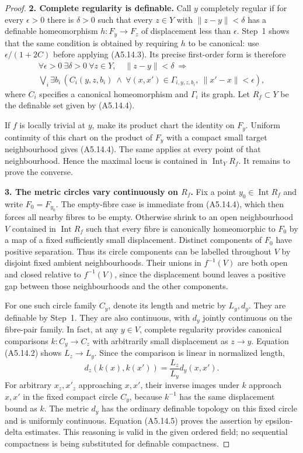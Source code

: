 \begin{proof}
\medskip\noindent\textbf{2. Complete regularity is definable.}
Call $y$ completely regular if for every $\epsilon>0$ there is
$\delta>0$ such that every $z\in Y$ with $\|z-y\|<\delta$
has a definable homeomorphism $h:F_y\to F_z$ of displacement
less than $\epsilon$.  Step~1 shows that the same condition is
obtained by requiring $h$ to be canonical: use
$\epsilon/(1+2C)$ before applying (A5.14.3).  Its precise
first-order form is therefore
\[
 \begin{gathered}
 \forall\epsilon>0\ \exists\delta>0\ \forall z\in Y,\quad
 \|z-y\|<\delta\ \Longrightarrow\\
 \bigvee_i\exists b_i\,
 \left(C_i(y,z,b_i)\ \wedge\
 \forall(x,x')\in\Gamma_{i,y,z,b_i},\ \|x'-x\|<\epsilon\right),
 \end{gathered}                                           \tag{A5.14.4}
\]
where $C_i$ specifies a canonical homeomorphism and
$\Gamma_i$ its graph.  Let $R_f\subset Y$ be the definable set
given by (A5.14.4).

If $f$ is locally trivial at $y$, make its product chart the
identity on $F_y$.  Uniform continuity of this chart on the
product of $F_y$ with a compact small target neighbourhood
gives (A5.14.4).  The same applies at every point of that
neighbourhood.  Hence the maximal locus is contained in
$\operatorname{Int}_Y R_f$.  It remains to prove the converse.

\medskip\noindent\textbf{3. The metric circles vary continuously on $R_f$.}
Fix a point $y_0\in\operatorname{Int}R_f$ and write $F_0=F_{y_0}$.
The empty-fibre case is immediate from (A5.14.4), which then
forces all nearby fibres to be empty.  Otherwise shrink to an
open neighbourhood $V$ contained in $\operatorname{Int}R_f$
such that every fibre is canonically homeomorphic to $F_0$
by a map of a fixed sufficiently small displacement.  Distinct
components of $F_0$ have positive separation.  Thus its circle
components can be labelled throughout $V$ by disjoint fixed
ambient neighbourhoods.  Their unions in $f^{-1}(V)$ are both
open and closed relative to $f^{-1}(V)$, since the displacement
bound leaves a positive gap between those neighbourhoods and
the other components.

For one such circle family $C_y$, denote its length and metric
by $L_y,d_y$.  They are definable by Step~1.  They are also
continuous, with $d_y$ jointly continuous on the fibre-pair
family.  In fact, at any $y\in V$, complete regularity provides
canonical comparisons $k:C_y\to C_z$ with arbitrarily small
displacement as $z\to y$.  Equation (A5.14.2) shows
$L_z\to L_y$.  Since the comparison is linear in normalized
length,
\[
 d_z(k(x),k(x'))=\frac{L_z}{L_y}d_y(x,x').                 \tag{A5.14.5}
\]
For arbitrary $x_z,x'_z$ approaching $x,x'$, their inverse
images under $k$ approach $x,x'$ in the fixed compact circle
$C_y$, because $k^{-1}$ has the same displacement bound as
$k$.  The metric $d_y$ has the ordinary definable topology
on this fixed circle and is uniformly continuous.  Equation
(A5.14.5) proves the assertion by epsilon-delta estimates.
This reasoning is valid in the given ordered field; no
sequential compactness is being substituted for definable
compactness.


\end{proof}
